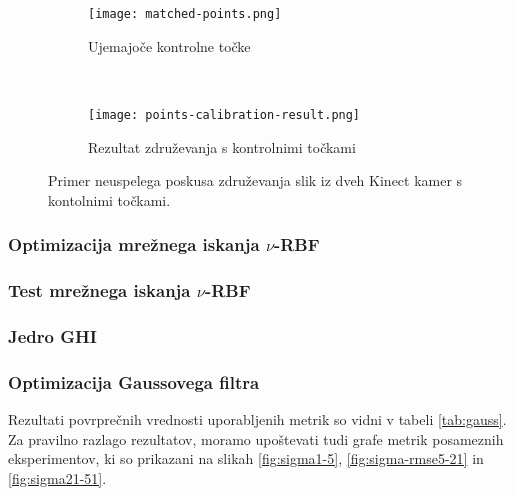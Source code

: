  \begin{figure}[!htb]
 	\centering
 	\begin{subfigure}[t]{0.45\columnwidth}
 		\texttt{[image: matched-points.png]}
 		\caption{Ujemajoče kontrolne točke}
 		\label{fig:zdruzevanje-ujemajoce-cp}
 	\end{subfigure}
 	~
 	\begin{subfigure}[t]{0.45\columnwidth}
 		\texttt{[image: points-calibration-result.png]}
 		\caption{Rezultat združevanja s kontrolnimi točkami}
 		\label{fig:zdruzevanje-result-cp}
 	\end{subfigure}
 	\caption{Primer neuspelega poskusa združevanja slik iz dveh Kinect kamer s kontolnimi točkami.}
 	\label{fig:zdruzevanje-cp}
 \end{figure}







\subsubsection{Optimizacija mrežnega iskanja \texorpdfstring{$\nu$}{nu}-RBF}





\subsubsection{Test mrežnega iskanja \texorpdfstring{$\nu$}{nu}-RBF}





\subsubsection{Jedro GHI}





\subsubsection{Optimizacija Gaussovega filtra}
Rezultati povrprečnih vrednosti uporabljenih metrik so vidni v tabeli \ref{tab:gauss}. Za pravilno razlago rezultatov, moramo upoštevati tudi grafe metrik posameznih eksperimentov, ki so prikazani na slikah \ref{fig:sigma1-5}, \ref{fig:sigma-rmse5-21} in \ref{fig:sigma21-51}. 



